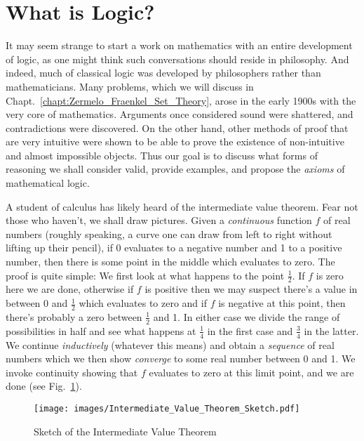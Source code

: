 \section{What is Logic?}
    It may seem strange to start a work on mathematics with an entire
    development of logic, as one might think such conversations should reside
    in philosophy. And indeed, much of classical logic was developed by
    philosophers rather than mathematicians. Many problems, which we will
    discuss in Chapt.~\ref{chapt:Zermelo_Fraenkel_Set_Theory}, arose in the
    early 1900s with the very core of mathematics. Arguments once considered
    sound were shattered, and contradictions were discovered. On the other hand,
    other methods of proof that are very intuitive were shown to be able to
    prove the existence of non-intuitive and almost impossible objects. Thus our
    goal is to discuss what forms of reasoning we shall consider valid, provide
    examples, and propose the \textit{axioms} of mathematical logic.
    \begin{example}
        \label{ex:Logic_IVP}%
        A student of calculus has likely heard of the intermediate value
        theorem. Fear not those who haven't,
        we shall draw pictures. Given a \textit{continuous} function $f$ of real
        numbers (roughly speaking, a curve one can draw from left to right
        without lifting up their pencil), if 0 evaluates to a negative number
        and 1 to a positive number, then there is some point in the middle which
        evaluates to zero. The proof is quite simple: We first look at what
        happens to the point $\frac{1}{2}$. If $f$ is zero here we are done,
        otherwise if $f$ is positive then we may suspect there's a value in
        between 0 and $\frac{1}{2}$ which evaluates to zero and if $f$ is
        negative at this point, then there's probably a zero between
        $\frac{1}{2}$ and 1. In either case we divide the range of possibilities
        in half and see what happens at $\frac{1}{4}$ in the first case and
        $\frac{3}{4}$ in the latter. We continue \textit{inductively} (whatever
        this means) and obtain a \textit{sequence} of real numbers which we then
        show \textit{converge} to some real number between 0 and 1. We invoke
        continuity showing that $f$ evaluates to zero at this limit point,
        and we are done (see Fig.~\ref{fig:Sketch_of_IVP}).
    \end{example}
    \begin{figure}[H]
        \centering
        \captionsetup{type=figure}
        \texttt{[image: images/Intermediate\_Value\_Theorem\_Sketch.pdf]}
        \caption{Sketch of the Intermediate Value Theorem}
        \label{fig:Sketch_of_IVP}
    \end{figure}
